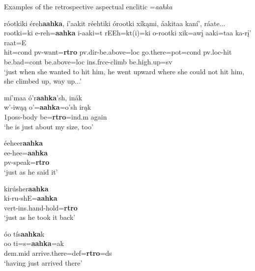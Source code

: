 \begin{exe}

\item\label{retrospectiveaspectualenclitic} Examples of the retrospective aspectual enclitic =\textit{aahka}

	\begin{xlist}

 	\item\label{retrospectiveaspectualenclitic1}
	\glll róotkiki éreh\textbf{aahka}, í'aakit réehtiki órootki xíkąmi, áakitaa kaní', ráate...\\
	rootki=ki e-reh=\textbf{aahka} i-aaki=t rEEh=kt(i)=ki o-rootki xik=awį aaki=taa ka-rį' raat=E\\
	\textnormal{hit}=cond pv-\textnormal{want}=\textbf{rtro} pv.dir-\textnormal{be.above}=loc \textnormal{go.there}=pot=cond pv.loc-\textnormal{hit} \textnormal{be.bad}=cont \textnormal{be.above}=loc ins.frce-\textnormal{climb} \textnormal{be.high.up}=sv\\
	\glt `just when she wanted to hit him, he went upward where she could not hit him, she climbed up, way up...' \citep[99]{hollow1973a}
	
	\item\label{retrospectiveaspectualenclitic2}
	\glll mí'maa ó'r\textbf{aahka}'sh, inák\\
	w'-iwąą o'=\textbf{aahka}=o'sh irąk\\
	1poss-\textnormal{body} \textnormal{be}=\textbf{rtro}=ind.m \textnormal{again}\\
	\glt `he is just about my size, too' \citep[142]{hollow1973a}
	




	\item\label{retrospectiveaspectualenclitic3}
	\glll éeheer\textbf{aahka}\\
	ee-hee=\textbf{aahka}\\
	pv-\textnormal{speak}=\textbf{rtro}\\
	\glt `just as he said it' \citep[23]{kennard1936}
	
	\item\label{retrospectiveaspectualenclitic4}
	\glll kirúsher\textbf{aahka}\\
	ki-ru-shE=\textbf{aahka}\\
	vert-ins.hand-\textnormal{hold}=\textbf{rtro}\\
	\glt `just as he took it back' \citep[23]{kennard1936}
	
	\item\label{retrospectiveaspectualenclitic5}
	\glll óo tís\textbf{aahka}k\\
	oo ti=s=\textbf{aahka}=ak\\
	dem.mid \textnormal{arrive.there}=def=\textbf{rtro}=ds\\
	\glt `having just arrived there' \citep[23]{kennard1936}


\end{xlist}
\end{exe}
